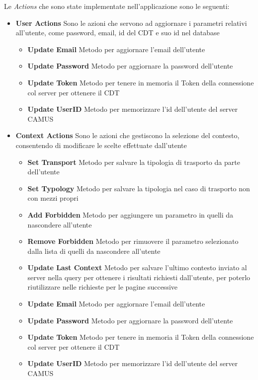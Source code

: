 Le \emph{Actions} che sono state implementate nell'applicazione sono le seguenti:
\begin{itemize}
	\item \textbf{User Actions} Sono le azioni che servono ad aggiornare i parametri relativi all'utente, come password, email, id del CDT e suo id nel database
	\begin{itemize}
		\item \textbf{Update Email} Metodo per aggiornare l'email dell'utente 
		\item \textbf{Update Password} Metodo per aggiornare la password dell'utente
		\item \textbf{Update Token} Metodo per tenere in memoria il Token della connessione col server per ottenere il CDT
		\item \textbf{Update UserID} Metodo per memorizzare l'id dell'utente del server CAMUS
	\end{itemize}
	\item \textbf{Context Actions} Sono le azioni che gestiscono la selezione del contesto, consentendo di modificare le scelte effettuate dall'utente
	\begin{itemize}
		\item \textbf{Set Transport} Metodo per salvare la tipologia di trasporto da parte dell'utente
		\item \textbf{Set Typology} Metodo per salvare la tipologia nel caso di trasporto non con mezzi propri
		\item \textbf{Add Forbidden} Metodo per aggiungere un parametro in quelli da nascondere all'utente
		\item \textbf{Remove Forbidden} Metodo per rimuovere il parametro selezionato dalla lista di quelli da nascondere all'utente
		\item \textbf{Update Last Context} Metodo per salvare l'ultimo contesto inviato al server nella query per ottenere i risultati richiesti dall'utente, per poterlo riutilizzare nelle richieste per le pagine successive
	\end{itemize}
	\begin{itemize}
		\item \textbf{Update Email} Metodo per aggiornare l'email dell'utente 
		\item \textbf{Update Password} Metodo per aggiornare la password dell'utente
		\item \textbf{Update Token} Metodo per tenere in memoria il Token della connessione col server per ottenere il CDT
		\item \textbf{Update UserID} Metodo per memorizzare l'id dell'utente del server CAMUS

\end{itemize}
\end{itemize}
